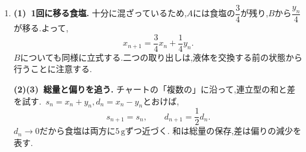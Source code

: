 \begin{enumerate}[label=\textbf{問\arabic*.},leftmargin=3.8em,format=\bookitemlink{practice-bridge}{solution}{problem}]
                \smallskip
                \textbf{(3)~和のを取る.}
                チャートの「総和」に沿って,添字を一つずらした和を引く.\,
                $\displaystyle n\ge1$で,
                \[
                  T_{n-1}=\sum_{k=0}^{n-1}(k+1)(n-k).
                \]
                両方にある項と,\,$\displaystyle T_n$にだけある最後の項を分けると,
                \begin{align*}
                  T_n-T_{n-1}
                    &=\sum_{k=0}^{n-1}(k+1)+(n+1)\\
                    &=\frac{(n+1)(n+2)}2.
                \end{align*}
                この右辺は,連続する三つの整数の積の差
                \[
                  \frac{(n+1)(n+2)(n+3)}6
                    -\frac{n(n+1)(n+2)}6
                \]
                に等しい.したがって,\,$\displaystyle T_0=1$から帰納法で
                \[
                  T_n=\frac{(n+1)(n+2)(n+3)}6
                \]
                を得る.和自体のを作り,各項の展開を省いた.

                \noindent \textbf{【別解】}\\
                玉$\displaystyle n$個と仕切り3本を一列に並べ,仕切りの間にある玉の数を順に$\displaystyle A,B,C,D$の個数とする.
                仕切りが隣り合う場合や端にある場合が,空の箱に対応する.\,
                $\displaystyle n+3$個の位置から仕切りの位置3個を選べばよいので,
                \[
                  T_n=\binom{n+3}{3}
                     =\frac{(n+1)(n+2)(n+3)}6.
                \]
                一つずつ増やす考え方と,一度に全体を数える考え方を比べてみよう.
          \item \textbf{(1)~1回に移る食塩.}
                十分に混ざっているため,$A$には食塩の$\dfrac{3}{4}$が残り,$B$から$\dfrac{y_n}{4}$が移る.よって,
                \[
                  x_{n+1}=\frac34x_n+\frac14y_n.
                \]
                $\displaystyle B$についても同様に立式する.二つの取り出しは,液体を交換する前の状態から行うことに注意する.

                \smallskip
                \textbf{(2)(3)~総量と偏りを追う.}
                チャートの「複数の」に沿って,連立型の和と差を試す.\,
                $\displaystyle s_n=x_n+y_n,d_n=x_n-y_n$とおけば,
                \[
                  s_{n+1}=s_n,\qquad d_{n+1}=\frac12d_n.
                \]
                $\displaystyle d_n\to0$だから食塩は両方に$\displaystyle 5\,\mathrm{g}$ずつ近づく.
                和は総量の保存,差は偏りの減少を表す.


\end{enumerate}
